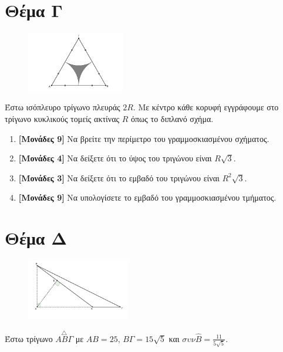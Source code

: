 \documentclass[12pt]{article}
\begin{document}
\section*{Θέμα Γ}
\noindent
\begin{figure}
    \centering
    \vspace{-50pt}
    \includegraphics[width=0.38\textwidth]{2017BGeo3}
\end{figure}

Έστω ισόπλευρο τρίγωνο πλευράς $2R$. Με κέντρο κάθε κορυφή εγγράφουμε στο τρίγωνο κυκλικούς τομείς ακτίνας $R$ όπως το διπλανό σχήμα.
\begin{enumerate}
    \item \textbf{[Μονάδες 9]}  Να βρείτε την περίμετρο του γραμμοσκιασμένου σχήματος.
    \item \textbf{[Μονάδες 4]}  Να δείξετε ότι το ύψος του τριγώνου είναι $R\sqrt{3}$.
    \item \textbf{[Μονάδες 3]}  Να δείξετε ότι το εμβαδό του τριγώνου είναι $R^2\sqrt{3}$.
    \item \textbf{[Μονάδες 9]}  Να υπολογίσετε το εμβαδό του γραμμοσκιασμένου τμήματος.
\end{enumerate}

\section*{Θέμα Δ}
\noindent
\begin{figure}
    \centering
    \vspace{-50pt}
    \includegraphics[width=0.4\textwidth]{2017BGeo4}
\end{figure}

Έστω τρίγωνο $\overset{\triangle}{ΑΒΓ}$ με $ΑΒ=25$, $ΒΓ=15\sqrt{5}$ και $συν\hat{Β}=\frac{11}{5\sqrt{5}}$.
\end{document}
